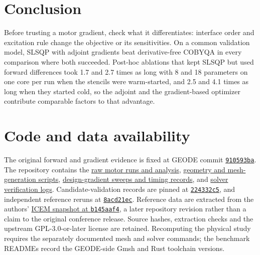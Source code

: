 \documentclass{anvil-paper}
\begin{document}
\section{Conclusion}
Before trusting a motor gradient, check what it differentiates: interface
order and excitation rule change the objective or its sensitivities. On a common validation model, SLSQP with adjoint
gradients beat derivative-free COBYQA in every comparison where both
succeeded. Post-hoc ablations that kept SLSQP but used forward
differences took 1.7 and 2.7 times as long with 8 and 18 parameters on one
core per run when the stencils were warm-started, and 2.5 and 4.1 times as
long when they started cold, so the adjoint and the gradient-based
optimizer contribute comparable factors to that advantage.

\section*{Code and data availability}
The original forward and gradient evidence is fixed at GEODE commit
\href{https://github.com/rjwalters/geode-fem/tree/910593bad6f64f9f01671c2632b57034e72b9c61}{\texttt{910593ba}}.
The repository contains the
\href{https://github.com/rjwalters/geode-fem/tree/910593bad6f64f9f01671c2632b57034e72b9c61/benchmarks/motor_reference/forward_harmonic}{raw motor runs and analysis},
\href{https://github.com/rjwalters/geode-fem/tree/910593bad6f64f9f01671c2632b57034e72b9c61/benchmarks/motor_reference/geometry}{geometry and mesh-generation scripts},
\href{https://github.com/rjwalters/geode-fem/tree/910593bad6f64f9f01671c2632b57034e72b9c61/benchmarks/motor_shape_gradient/design}{design-gradient sweeps and timing records},
and \href{https://github.com/rjwalters/geode-fem/tree/910593bad6f64f9f01671c2632b57034e72b9c61/benchmarks/motor_nonlinear_m1}{solver verification logs}.
Candidate-validation records are pinned at
\href{https://github.com/rjwalters/geode-fem/tree/224332c526be1191183af82b610973c7778de720/benchmarks/motor_validation}{\texttt{224332c5}},
and independent reference reruns at
\href{https://github.com/rjwalters/geode-fem/tree/8acd21ecf85d89fe077275a3c04ca70b53963d43/benchmarks/motor_reference/reference_refinement}{\texttt{8acd21ec}}.
Reference data are extracted from the authors'
\href{https://github.com/MichaelWiesheu/ICEMsnapshot/tree/b145aaf4ab1a6424828bc941eaf172f48fa0d458}{ICEM snapshot at \texttt{b145aaf4}},
a later repository revision rather than a claim to the original conference
release. Source hashes, extraction checks and the upstream GPL-3.0-or-later license
are retained. Recomputing the physical study requires the separately
documented mesh and solver commands; the benchmark READMEs record the
GEODE-side Gmsh and Rust toolchain versions.
\end{document}
